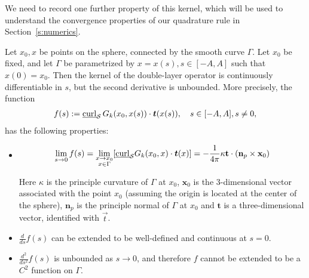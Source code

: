 We need to record one further property of this kernel, which will be
used to understand the convergence properties of our quadrature rule in
Section~\ref{s:numerics}.

\begin{lemma}
\label{regularity}
Let $x_0,x$ be points on the sphere, connected by the smooth curve
$\Gamma$. Let $x_0$ be fixed, and let $\Gamma$ be parametrized by
$x=x(s), s\in[-A,A]$ such that $x(0)=x_{0}$. Then the kernel of the
double-layer operator is continuously differentiable in $s$, but the
second derivative is unbounded. More precisely, the function 
\begin{align*}
  f(s):=\underline{\mbox{curl}}_{\S}\,
    G_{k}(x_0,x(s))\cdot\vec{t}(x(s)), \quad s\in[-A,A], s \neq 0,
\end{align*}
has the following properties:
\begin{itemize}
\item 
\begin{align*} 
  \lim_{\substack {s \rightarrow 0}} f(s) = 
   \lim_{\substack {x \rightarrow x_{0} \\ x \in \Gamma}}
   [\underline{\mbox{curl}}_{\S}G_{k}(x_{0},x) \cdot \vec{t}(x)] =  
   -\frac{1}{4\pi} \kappa \mathbf{t}\cdot(\mathbf{n}_{p}
    \times \mathbf{x}_0)
\end{align*}

Here $\kappa$ is the principle curvature of $\Gamma$ at $x_{0}$,
$\mathbf{x}_0$ is the 3-dimensional vector associated with the point
$x_0$ (assuming the origin is located at the center of the sphere),
$\mathbf{n}_p$ is the principle normal of $\Gamma$ at $x_0$ and
$\mathbf{t}$ is a three-dimensional vector, identified with $\vec{t}$.
\item $\frac{d}{ds}f(s)$ can be extended to be well-defined and
continuous at $s=0$.
\item $\frac{d^2}{ds^2} f(s)$ is unbounded as $s\rightarrow 0$, and
therefore $f$ cannot be extended to be a $C^{2}$ function on $\Gamma$.
\end{itemize}
\end{lemma}

